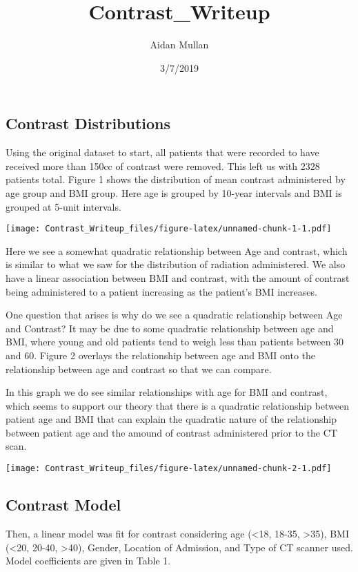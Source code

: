 \documentclass[]{article}
\title{Contrast\_Writeup}
\author{Aidan Mullan}
\date{3/7/2019}
\begin{document}
\maketitle

\subsection{Contrast Distributions}\label{contrast-distributions}

Using the original dataset to start, all patients that were recorded to
have received more than 150cc of contrast were removed. This left us
with 2328 patients total. Figure 1 shows the distribution of mean
contrast administered by age group and BMI group. Here age is grouped by
10-year intervals and BMI is grouped at 5-unit intervals.

\texttt{[image: Contrast\_Writeup\_files/figure-latex/unnamed-chunk-1-1.pdf]}

Here we see a somewhat quadratic relationship between Age and contrast,
which is similar to what we saw for the distribution of radiation
administered. We also have a linear association between BMI and
contrast, with the amount of contrast being administered to a patient
increasing as the patient's BMI increases.

One question that arises is why do we see a quadratic relationship
between Age and Contrast? It may be due to some quadratic relationship
between age and BMI, where young and old patients tend to weigh less
than patients between 30 and 60. Figure 2 overlays the relationship
between age and BMI onto the relationship between age and contrast so
that we can compare.

In this graph we do see similar relationships with age for BMI and
contrast, which seems to support our theory that there is a quadratic
relationship between patient age and BMI that can explain the quadratic
nature of the relationship between patient age and the amound of
contrast administered prior to the CT scan.

\texttt{[image: Contrast\_Writeup\_files/figure-latex/unnamed-chunk-2-1.pdf]}

\subsection{Contrast Model}\label{contrast-model}

Then, a linear model was fit for contrast considering age
(\textless{}18, 18-35, \textgreater{}35), BMI (\textless{}20, 20-40,
\textgreater{}40), Gender, Location of Admission, and Type of CT scanner
used. Model coefficients are given in Table 1.
\end{document}
